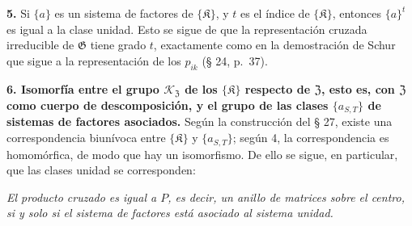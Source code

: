 \noindent\textbf{5.} Si \(\{a\}\) es un sistema de factores de \(\{\mathfrak K\}\), y \(t\) es el índice de \(\{\mathfrak K\}\), entonces \(\{a\}^t\) es igual a la clase unidad. Esto se sigue de que la representación cruzada irreducible de \(\mathfrak G\) tiene grado \(t\), exactamente como en la demostración de Schur que sigue a la representación de los \(p_{ik}\) (§ 24, p.~37).

\noindent\textbf{6. Isomorfía entre el grupo \(\mathscr K_{\mathfrak Z}\) de los \(\{\mathfrak K\}\) respecto de \(\mathfrak Z\), esto es, con \(\mathfrak Z\) como cuerpo de descomposición, y el grupo de las clases \(\{a_{S,T}\}\) de sistemas de factores asociados.} Según la construcción del § 27, existe una correspondencia biunívoca entre \(\{\mathfrak K\}\) y \(\{a_{S,T}\}\); según 4, la correspondencia es homomórfica, de modo que hay un isomorfismo. De ello se sigue, en particular, que las clases unidad se corresponden:

\noindent\emph{El producto cruzado es igual a \(P\), es decir, un anillo de matrices sobre el centro, si y solo si el sistema de factores está asociado al sistema unidad.}
